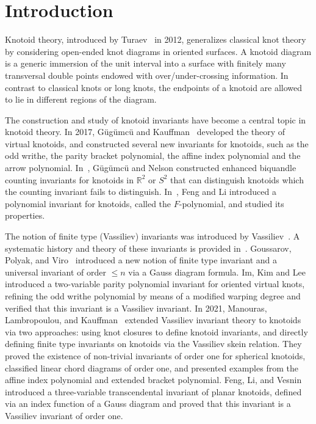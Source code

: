 \documentclass[12pt]{amsart}
\theoremstyle{noparens}
\numberwithin{equation}{section}
\numberwithin{equation}{section}
\begin{document}
\section{Introduction}

Knotoid theory, introduced by Turaev~\cite{Tur1} in 2012, generalizes classical knot theory by considering open-ended knot diagrams in oriented surfaces. A knotoid diagram is a generic immersion of the unit interval into a surface with finitely many transversal double points endowed with over/under-crossing information. In contrast to classical knots or long knots, the endpoints of a knotoid are allowed to lie in different regions of the diagram. 

The construction and study of knotoid invariants have become a central topic in knotoid theory. 
In 2017, G\"{u}g\"{u}mc\"{u} and Kauffman~\cite{GK} developed the theory of virtual knotoids, and constructed several new invariants for knotoids, such as the odd writhe, the parity bracket polynomial, the affine index polynomial and the arrow polynomial. In~\cite{GN}, G\"{u}g\"{u}mc\"{u} and Nelson constructed enhanced biquandle counting invariants for knotoids in $\mathbb{R}^2$ or $S^2$ that can distinguish knotoids which the counting invariant fails to distinguish. In~\cite{FL}, Feng and Li introduced a polynomial invariant for knotoids, called the $F$-polynomial, and studied its properties. 

The notion of finite type (Vassiliev) invariants was introduced by Vassiliev~\cite{Vas1, Vas2}. A systematic history and theory of these invariants is provided in~\cite{CDM}. Goussarov, Polyak, and Viro~\cite{GPV} introduced a new notion of finite type invariant and a universal invariant of order $\leq n$ via a Gauss diagram formula. Im, Kim and Lee~\cite{IKL} introduced a two-variable parity polynomial invariant for oriented virtual knots, refining the odd writhe polynomial by means of a modified warping degree and verified that this invariant is a Vassiliev invariant.  In 2021, Manouras, Lambropoulou, and Kauffman~\cite{MLK} extended Vassiliev invariant theory to knotoids via two approaches: using knot closures to define knotoid invariants, and directly defining finite type invariants on knotoids via the Vassiliev skein relation. They proved the existence of non-trivial invariants of order one for spherical knotoids, classified linear chord diagrams of order one, and presented examples from the affine index polynomial and extended bracket polynomial. Feng, Li, and Vesnin~\cite{FLV} introduced a three-variable transcendental invariant of planar knotoids, defined via an index function of a Gauss diagram and proved that this invariant is a Vassiliev invariant of order one. 
\end{document}
